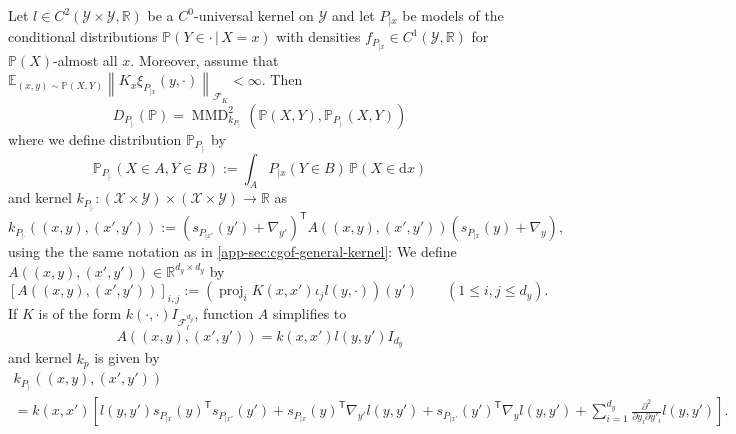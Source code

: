\documentclass{uai2023} %
\begin{document}
\begin{lemma}\label{lemma:kcsd-relation-mmd}
Let $l \in C^2(\mathcal{Y} \times \mathcal{Y}, \mathbb{R})$ be a $C^0$-universal kernel on $\mathcal{Y}$ and let $P_{|x}$ be models of the conditional distributions $\mathbb{P}(Y \in \cdot \,|\, X = x)$ with densities $f_{P_{|x}} \in C^1(\mathcal{Y}, \mathbb{R})$ for $\mathbb{P}(X)$-almost all $x$.
Moreover, assume that $\mathbb{E}_{(x,y) \sim \mathbb{P}(X, Y)} \left\|K_{x} \xi_{P_{|x}}(y, \cdot) \right\|_{\mathcal{F}_K} < \infty$.
Then
\begin{equation*}
    D_{P_{|\cdot}}(\mathbb{P}) = \operatorname{MMD}_{k_{P_{|\cdot}}}^2(\mathbb{P}(X, Y), \mathbb{P}_{P_{|\cdot}}(X, Y) )
\end{equation*}
where we define distribution $\mathbb{P}_{P_{|\cdot}}$ by \begin{equation*}
    \mathbb{P}_{P_{|\cdot}}(X \in A, Y \in B) := \int_A P_{|x}(Y \in B) \, \mathbb{P}(X \in \mathrm{d}x)
\end{equation*} and kernel $k_{P_{|\cdot}} \colon (\mathcal{X} \times \mathcal{Y}) \times (\mathcal{X} \times \mathcal{Y}) \to \mathbb{R}$ as
\begin{equation*}
    k_{P_{|\cdot}}((x, y), (x', y')) := (s_{P_{|x'}}(y') + \nabla_{y'})^\mathsf{T} A((x, y), (x', y')) (s_{P_{|x}}(y) + \nabla_y),
\end{equation*}
using the the same notation as in \cref{app-sec:cgof-general-kernel}:
We define $A((x, y), (x', y')) \in \mathbb{R}^{d_y \times d_y}$ by
\begin{equation*}
    \left[A((x, y), (x', y'))\right]_{i,j} := (\operatorname{proj}_i K(x, x') \iota_j l(y, \cdot))(y') \qquad (1 \leq i, j \leq d_y).
\end{equation*}
If $K$ is of the form $k(\cdot, \cdot) I_{\mathcal{F}_l^{d_y}}$, function $A$ simplifies to
\begin{equation*}
    A((x, y), (x', y')) = k(x, x') l(y, y') I_{d_y}
\end{equation*}
and kernel $\widehat{k_p}$ is given by
\begin{multline*}
k_{P_{|\cdot}}((x, y), (x', y')) \\
= k(x, x') \left[ l(y, y') s_{P_{|x}}(y)^\mathsf{T} s_{P_{|x'}}(y') + s_{P_{|x}}(y)^\mathsf{T}\nabla_{y'} l(y, y') + s_{P_{|x'}}(y')^\mathsf{T} \nabla_y l(y, y') + \sum_{i=1}^{d_y} \frac{\partial^2}{\partial y_i \partial y'_i} l(y, y')\right].
\end{multline*}
\end{lemma}
\end{document}
